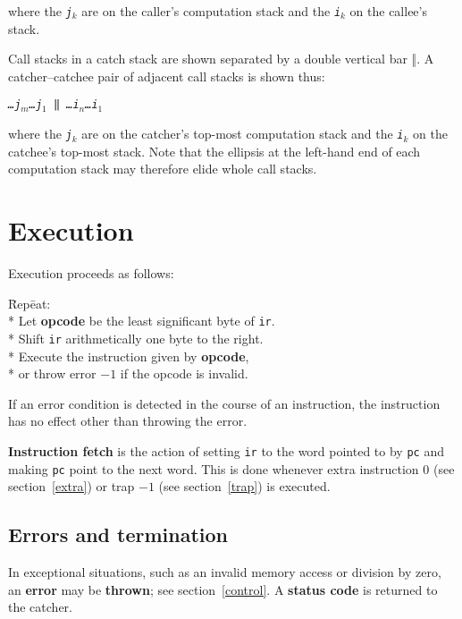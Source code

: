 \documentclass[a4paper]{article}
\newcommand{\spic}[1]{\texttt{\slshape{#1\/}}}
\begin{document}
\noindent where the \spic{j$_k$} are on the caller’s computation stack and the \spic{i$_k$} on the callee’s stack.

Call stacks in a catch stack are shown separated by a double vertical bar {\rm ‖}. A catcher–catchee pair of adjacent call stacks is shown thus:

\begin{center}
\spic{…j$_m$\dots j$_1$ {\rm ‖} …i$_n$\dots i$_1$}
\end{center}

\noindent where the \spic{j$_k$} are on the catcher’s top-most computation stack and the \spic{i$_k$} on the catchee’s top-most stack. Note that the ellipsis at the left-hand end of each computation stack may therefore elide whole call stacks.


\section{Execution}
\label{execution}

Execution proceeds as follows:

\begin{tabbing}
\hspace{0.2in}\=Rep\=eat:\+\+ \\*
Let \textbf{opcode} be the least significant byte of {\tt ir}. \\*
Shift {\tt ir} arithmetically one byte to the right. \\*
Execute the instruction given by \textbf{opcode}, \\*
\hspace{1em}or throw error $-1$ if the opcode is invalid. \-
\end{tabbing}

If an error condition is detected in the course of an instruction, the instruction has no effect other than throwing the error.

{\bf Instruction fetch} is the action of setting {\tt ir} to the word pointed to by {\tt pc} and making {\tt pc} point to the next word. This is done whenever extra instruction $0$ (see section~\ref{extra}) or trap $-1$ (see section~\ref{trap}) is executed.


\subsection{Errors and termination}
\label{errors}

In exceptional situations, such as an invalid memory access or division by zero, an {\bf error} may be {\bf thrown}; see section~\ref{control}. A {\bf status code} is returned to the catcher.
\end{document}
